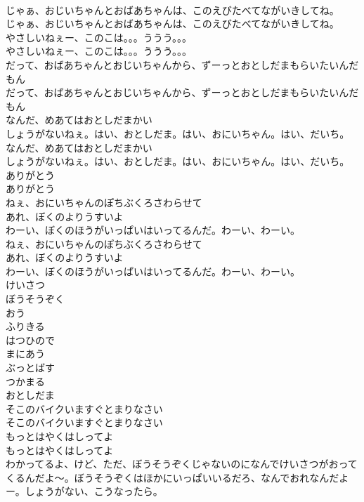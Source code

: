 \documentclass[8pt]{extreport}
\begin{document}
\begin{CJK}{UTF8}{min}
\\	じゃぁ、おじいちゃんとおばあちゃんは、このえびたべてながいきしてね。
\\	じゃぁ、おじいちゃんとおばあちゃんは、このえびたべてながいきしてね。
\\	やさしいねぇー、このこは。。。ううう。。。
\\	やさしいねぇー、このこは。。。ううう。。。
\\	だって、おばあちゃんとおじいちゃんから、ずーっとおとしだまもらいたいんだもん
\\	だって、おばあちゃんとおじいちゃんから、ずーっとおとしだまもらいたいんだもん
\\	なんだ、めあてはおとしだまかい
\\	しょうがないねぇ。はい、おとしだま。はい、おにいちゃん。はい、だいち。
\\	なんだ、めあてはおとしだまかい
\\	しょうがないねぇ。はい、おとしだま。はい、おにいちゃん。はい、だいち。
\\	ありがとう
\\	ありがとう
\\	ねぇ、おにいちゃんのぽちぶくろさわらせて
\\	あれ、ぼくのよりうすいよ
\\	わーい、ぼくのほうがいっぱいはいってるんだ。わーい、わーい。
\\	ねぇ、おにいちゃんのぽちぶくろさわらせて
\\	あれ、ぼくのよりうすいよ
\\	わーい、ぼくのほうがいっぱいはいってるんだ。わーい、わーい。
\\	けいさつ
\\	ぼうそうぞく
\\	おう
\\	ふりきる
\\	はつひので
\\	まにあう
\\	ぶっとばす
\\	つかまる
\\	おとしだま
\\	そこのバイクいますぐとまりなさい
\\	そこのバイクいますぐとまりなさい
\\	もっとはやくはしってよ
\\	もっとはやくはしってよ
\\	わかってるよ、けど、ただ、ぼうそうぞくじゃないのになんでけいさつがおってくるんだよ〜。ぼうそうぞくはほかにいっぱいいるだろ、なんでおれなんだよー。しょうがない、こうなったら。

\end{CJK}
\end{document}
